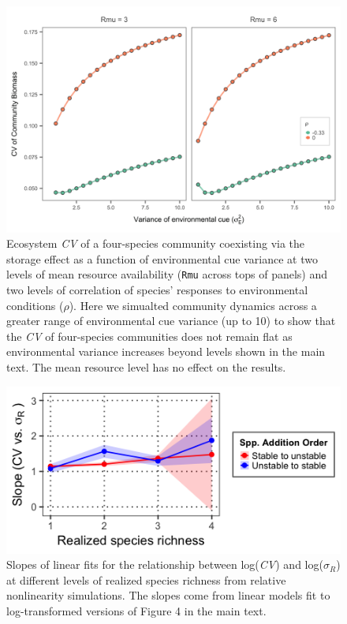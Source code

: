 \documentclass[11pt,]{article}
\begin{document}
\newpage{}

\begin{figure}[!ht]
  \centering
      \includegraphics[width=5in]{./components/SI_storage_effect_two_rmus_fourSpeciesOnly.png}
  \caption{Ecosystem \emph{CV} of a four-species community coexisting via the storage effect as a function of environmental cue variance at two levels of mean resource availability (\texttt{Rmu} across tops of panels) and two levels of correlation of species' responses to environmental conditions ($\rho$). Here we simualted community dynamics across a greater range of environmental cue variance (up to 10) to show that the \emph{CV} of four-species communities does not remain flat as environmental variance increases beyond levels shown in the main text. The mean resource level has no effect on the results.}
\end{figure}

\newpage{}

\begin{figure}[!ht]
  \centering
      \includegraphics[width=5in]{./components/relative_nonlinearity_div+envar_loglog_slopes.png}
  \caption{Slopes of linear fits for the relationship between log(\emph{CV}) and log($\sigma_R$) at different levels of realized species richness from relative nonlinearity simulations. The slopes come from linear models fit to log-transformed versions of Figure 4 in the main text.}
\end{figure}
\end{document}
